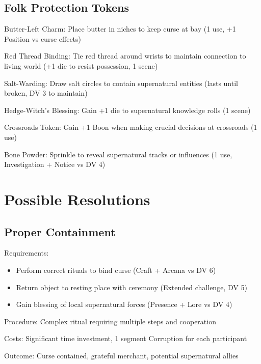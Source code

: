 \documentclass[11pt]{article}
\newenvironment{mechanics}{\begin{description}[leftmargin=*,style=standard]}{\end{description}}
\newenvironment{resolution}[1]{\begin{description}[leftmargin=*,style=standard]\item[\textbf{#1}]}{\end{description}}
\begin{document}
\subsection{Folk Protection Tokens}
\begin{mechanics}
\item[Butter-Left Charm:] Place butter in niches to keep curse at bay (1 use, +1 Position vs curse effects)
\item[Red Thread Binding:] Tie red thread around wrists to maintain connection to living world (+1 die to resist possession, 1 scene)
\item[Salt-Warding:] Draw salt circles to contain supernatural entities (lasts until broken, DV 3 to maintain)
\item[Hedge-Witch's Blessing:] Gain +1 die to supernatural knowledge rolls (1 scene)
\item[Crossroads Token:] Gain +1 Boon when making crucial decisions at crossroads (1 use)
\item[Bone Powder:] Sprinkle to reveal supernatural tracks or influences (1 use, Investigation + Notice vs DV 4)
\end{mechanics}

\section{Possible Resolutions}

\subsection{Proper Containment}
\begin{resolution}{Proper Containment}
\item[Requirements:] 
  \begin{itemize}
    \item Perform correct rituals to bind curse (Craft + Arcana vs DV 6)
    \item Return object to resting place with ceremony (Extended challenge, DV 5)
    \item Gain blessing of local supernatural forces (Presence + Lore vs DV 4)
  \end{itemize}
\item[Procedure:] Complex ritual requiring multiple steps and cooperation
\item[Costs:] Significant time investment, 1 segment Corruption for each participant
\item[Outcome:] Curse contained, grateful merchant, potential supernatural allies
\end{resolution}
\end{document}
